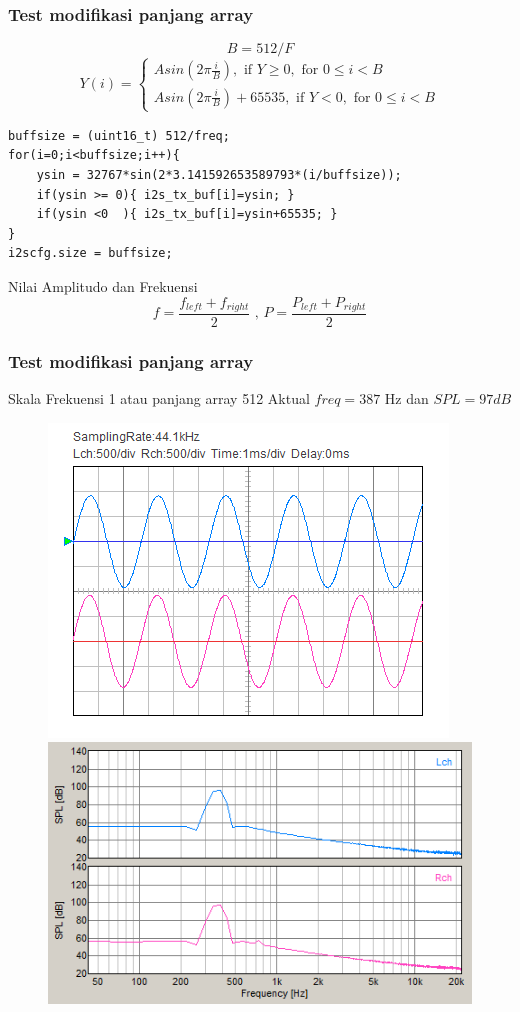 \documentclass[table,dvipsnames,10pt]{beamer}
\begin{document}
	\begin{frame}[fragile]
	\frametitle{Test modifikasi panjang array}
	\begin{exampleblock}{}
		\[ B = 512/F \]
		\[
		Y(i) =
		\begin{cases}
		A sin(2 \pi \frac{i}{B}), \text{ if } Y \geq 0, \text{ for } 0 \leq i < B\\
		A sin(2 \pi \frac{i}{B})+65535, \text{ if } Y < 0, \text{ for } 0 \leq i < B
		\end{cases}
		\]
	\end{exampleblock}
	\begin{exampleblock}{}
\begin{verbatim}
buffsize = (uint16_t) 512/freq;
for(i=0;i<buffsize;i++){
	ysin = 32767*sin(2*3.141592653589793*(i/buffsize));
	if(ysin >= 0){ i2s_tx_buf[i]=ysin; }
	if(ysin <0  ){ i2s_tx_buf[i]=ysin+65535; }
}
i2scfg.size = buffsize;
		\end{verbatim}
	\end{exampleblock}
	\begin{exampleblock}{Nilai Amplitudo dan Frekuensi }
		\[ f = \frac{f_{left} + f_{right}}{2} \text{ , } P = \frac{P_{left} + P_{right}}{2}\]
	\end{exampleblock}
	\end{frame}

	\begin{frame}[fragile]
	\frametitle{Test modifikasi panjang array}
	\begin{exampleblock}{Skala Frekuensi 1 atau panjang array 512}
		Aktual $freq = 387$ Hz dan $SPL = 97 dB$
		\begin{figure}[H]
			\centering
			\includegraphics[width=0.4\linewidth]{result/day_4/newsine400}
			\includegraphics[width=0.45\linewidth]{result/day_4/newsine400fft}
		\end{figure}
	\end{exampleblock}
	\end{frame}
\end{document}
